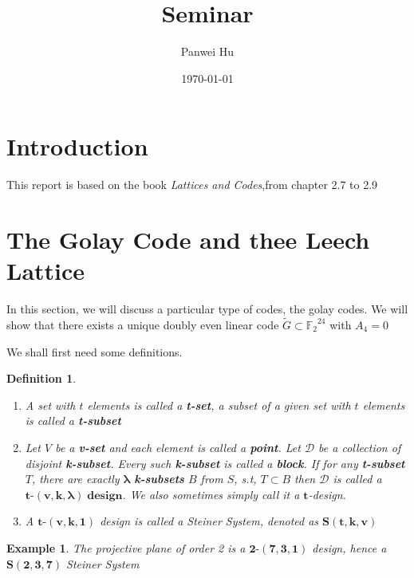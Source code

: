 \documentclass{article}
\title{Seminar}
\date{\today}
\author{Panwei Hu}
\newtheorem{definition}[theorem]{Definition}
\newtheorem{example}[theorem]{Example}
\numberwithin{equation}{theorem}
\newcommand{\GExtend}{\ensuremath{\widetilde{G}}}
\newcommand{\Ftwo}{\ensuremath{\mathbb{F}_2}}
\newcommand{\tCompleteDesign}{\ensuremath{\bm{t\mbox{-}(v,k,\lambda)\; design}}}
\begin{document}
  \maketitle
  \newpage

\tableofcontents
	\newpage
  \newpage
\newpage
\section{Introduction}

This report is based on the book \emph{Lattices and Codes},from chapter 2.7 to 2.9
\newpage
\section{The Golay Code and thee Leech Lattice}
In this section, we will discuss a particular type of codes, the golay codes. We will show that there exists a unique doubly even linear code  $\GExtend \subset \Ftwo^{24}$ with $A_4 = 0$ 

We shall first need some definitions.
\begin{definition}\hfill
	\begin{enumerate}
		\item A set with $t$ elements is called a \textbf{t-set}, a subset of a given set with $t$ elements is called a \textbf{t-subset}
		\item Let $V$ be a \textbf{v-set} and each element is called a \textbf{point}. Let $\mathscr{D}$ be a collection of disjoint \textbf{k-subset}. Every such \textbf{k-subset} is called a \textbf{block}. If for any \textbf{t-subset} $T$, there are exactly $\mathbf{\lambda}$ \textbf{k-subsets} $B$ from $S$, s.t, $T \subset B$ then $\mathscr{D}$ is called a \tCompleteDesign . We also sometimes simply call it a $\bm{t}$-design.
		\item A $\bm{t\mbox{-}(v,k,1)}$ design is called a \emph{Steiner System}, denoted as $\bm{S(t,k,v)}$
	\end{enumerate}
\end{definition}
\begin{example}\label{projPlane}
		The projective plane of order 2 is a $\bm{2\mbox{-}(7,3,1)}$ design, hence a $\bm{S(2,3,7)}$ \emph{Steiner System}
\end{example}
\end{document}
